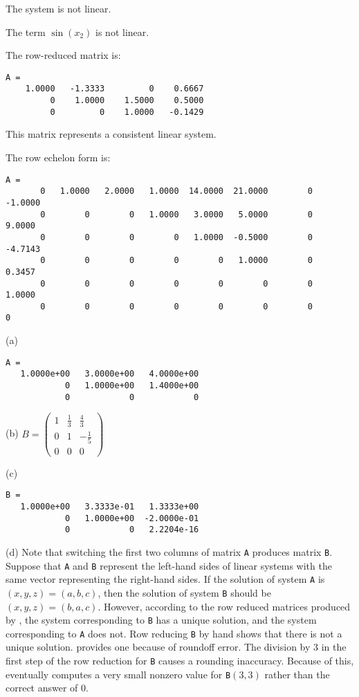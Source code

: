 \newpage
{} \ans The system is not linear.

\soln The term $\sin(x_2)$ is not linear.

 The row-reduced matrix is:
\begin{verbatim}
A =
    1.0000   -1.3333         0    0.6667
         0    1.0000    1.5000    0.5000
         0         0    1.0000   -0.1429
\end{verbatim}
This matrix represents a consistent linear system.

 The row echelon form is:
\begin{verbatim}
A = 
       0   1.0000   2.0000   1.0000  14.0000  21.0000        0  -1.0000
       0        0        0   1.0000   3.0000   5.0000        0   9.0000
       0        0        0        0   1.0000  -0.5000        0  -4.7143
       0        0        0        0        0   1.0000        0   0.3457
       0        0        0        0        0        0        0   1.0000
       0        0        0        0        0        0        0        0
\end{verbatim}

(a)
\begin{verbatim}
A =
   1.0000e+00   3.0000e+00   4.0000e+00
            0   1.0000e+00   1.4000e+00
            0            0            0
\end{verbatim}

(b)
$B = \left(\begin{array}{rrr}
1 & \frac{1}{3} & \frac{4}{3} \\
0 & 1 & -\frac{1}{5} \\
0 & 0 & 0\end{array} \right)$

(c)
\begin{verbatim}
B =
   1.0000e+00   3.3333e-01   1.3333e+00
            0   1.0000e+00  -2.0000e-01
            0            0   2.2204e-16
\end{verbatim}


(d) Note that switching the first two columns of matrix {\tt A} produces
matrix {\tt B}.  Suppose that {\tt A} and {\tt B} represent the left-hand
sides of linear systems with the same vector representing the right-hand
sides.  If the solution of system {\tt A} is $(x,y,z) = (a,b,c)$, then the
solution of system {\tt B} should be $(x,y,z) = (b,a,c)$.  However,
according to the row reduced matrices produced by \Matlab, the system
corresponding to {\tt B} has a unique solution, and the system
corresponding to {\tt A} does not.  Row reducing {\tt B} by hand shows
that there is not a unique solution.  \Matlab provides one because of 
roundoff error.  The division by 3 in the first step of the row reduction
for {\tt B} causes a rounding inaccuracy.  Because of this, \Matlab
eventually computes a very small nonzero value for {\tt B}$(3,3)$
rather than the correct answer of 0.



